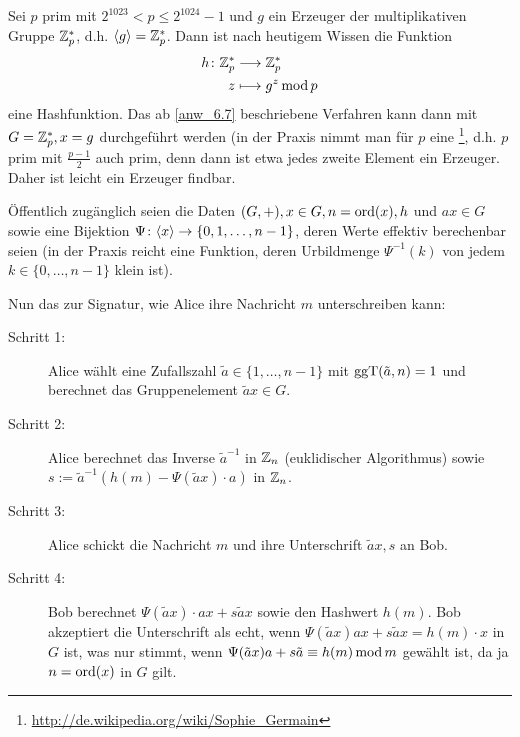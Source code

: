 \begin{bsp}
	Sei $p$ prim mit $2^{1023} < p \leq 2^{1024} - 1$ und $g$ ein Erzeuger der multiplikativen Gruppe $\mathbb{Z}_p^*$, d.h. $\langle g\rangle = \mathbb{Z}_p^*$. 
	Dann ist nach heutigem Wissen die Funktion
	\begin{equation}
	\begin{aligned}
		h\colon \mathbb{Z}_p^* &\longrightarrow \mathbb{Z}_p^* \\
		z &\longmapsto g^z \operatorname{mod} p
	\end{aligned}
	\end{equation}
	eine Hashfunktion. 
	Das ab \ref{anw_6.7} beschriebene Verfahren kann dann mit $G = \mathbb{Z}_p^*, x = g$ durchgeführt werden (in der Praxis nimmt man für $p$ eine \footnote{\url{http://de.wikipedia.org/wiki/Sophie_Germain}}, d.h. $p$ prim mit $\frac{p-1}{2}$ auch prim, denn dann ist etwa jedes zweite Element ein Erzeuger. 
	Daher ist leicht ein Erzeuger findbar.
\end{bsp}

\begin{bem}
	Öffentlich zugänglich seien die Daten $(G,+), x \in G, n = \operatorname{ord}(x), h$ und $ax \in G$ sowie eine Bijektion $\Psi\colon \langle x\rangle \rightarrow \{0,1,\dots,n-1\}$, deren Werte effektiv berechenbar seien (in der Praxis reicht eine Funktion, deren Urbildmenge $\Psi^{-1}(k)$ von jedem $k \in \{0,\dots,n-1\}$ klein ist).
\end{bem}

\begin{anw}
\label{anw_6.7}
	Nun das  zur Signatur, wie Alice ihre Nachricht $m$ unterschreiben kann: 
	\begin{description}
		\item[Schritt 1:] Alice wählt eine Zufallszahl $\tilde{a} \in \{1,\dots,n-1\}$ mit $\operatorname{ggT}(\tilde{a},n) = 1$ und berechnet das Gruppenelement $\tilde{a}x \in G$.
		\item[Schritt 2:] Alice berechnet das Inverse $\tilde{a}^{-1}$ in $\mathbb{Z}_n$ (euklidischer Algorithmus) sowie $s := \tilde{a}^{-1} (h(m)-\Psi(\tilde{a}x)\cdot a)$ in $\mathbb{Z}_n$.
		\item[Schritt 3:] Alice schickt die Nachricht $m$ und ihre Unterschrift $\tilde{a}x,s$ an Bob.
		\item[Schritt 4:] Bob berechnet $\Psi(\tilde{a}x) \cdot ax + s \tilde{a}x$ sowie den Hashwert $h(m)$. 
		Bob akzeptiert die Unterschrift als echt, wenn $\Psi(\tilde{a}x) ax + s \tilde{a}x = h(m) \cdot x$ in $G$ ist, was nur stimmt, wenn $\Psi(\tilde{a}x)a + s\tilde{a} \equiv h(m) \operatorname{mod} m$ gewählt ist, da ja $n = \operatorname{ord}(x)$ in $G$ gilt.
	\end{description}
\end{anw}

